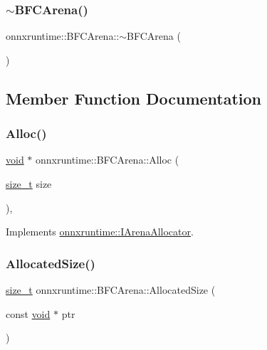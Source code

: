 \subsubsection{\texorpdfstring{$\sim$\+B\+F\+C\+Arena()}{~BFCArena()}}
{\footnotesize\ttfamily onnxruntime\+::\+B\+F\+C\+Arena\+::$\sim$\+B\+F\+C\+Arena (\begin{DoxyParamCaption}{ }\end{DoxyParamCaption})\hspace{0.3cm}{\ttfamily [override]}}



\subsection{Member Function Documentation}
\mbox{\label{classonnxruntime_1_1BFCArena_a1e4bda05da04e05e5a9a58c3839e2a14}} 
\subsubsection{\texorpdfstring{Alloc()}{Alloc()}}
{\footnotesize\ttfamily \mbox{\hyperlink{mlasi_8h_a88f941d423cb2a819b70a1358982b1a6}{void}} $\ast$ onnxruntime\+::\+B\+F\+C\+Arena\+::\+Alloc (\begin{DoxyParamCaption}\item[{\mbox{\hyperlink{mlasi_8h_a503efbc1c6e50825320ad909366b78ab}{size\+\_\+t}}}]{size }\end{DoxyParamCaption})\hspace{0.3cm}{\ttfamily [override]}, {\ttfamily [virtual]}}



Implements \mbox{\hyperlink{classonnxruntime_1_1IArenaAllocator_a879507b0ec3b184d9bb60281191b8cd6}{onnxruntime\+::\+I\+Arena\+Allocator}}.

\mbox{\label{classonnxruntime_1_1BFCArena_a290c11e641ab3a5af5bb8c6c1c06008a}} 
\subsubsection{\texorpdfstring{Allocated\+Size()}{AllocatedSize()}}
{\footnotesize\ttfamily \mbox{\hyperlink{mlasi_8h_a503efbc1c6e50825320ad909366b78ab}{size\+\_\+t}} onnxruntime\+::\+B\+F\+C\+Arena\+::\+Allocated\+Size (\begin{DoxyParamCaption}\item[{const \mbox{\hyperlink{mlasi_8h_a88f941d423cb2a819b70a1358982b1a6}{void}} $\ast$}]{ptr }\end{DoxyParamCaption})}

